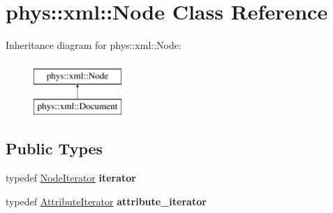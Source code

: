 \hypertarget{classphys_1_1xml_1_1Node}{
\section{phys::xml::Node Class Reference}
\label{d7/d0a/classphys_1_1xml_1_1Node}
}
Inheritance diagram for phys::xml::Node:\begin{figure}[H]
\begin{center}
\leavevmode
\includegraphics[height=2cm]{d7/d0a/classphys_1_1xml_1_1Node}
\end{center}
\end{figure}
\subsection*{Public Types}
\begin{DoxyCompactItemize}
\item 
\hypertarget{classphys_1_1xml_1_1Node_a0da067636c89829a111dd51037cea6b3}{
typedef \hyperlink{classphys_1_1xml_1_1NodeIterator}{NodeIterator} {\bfseries iterator}}
\label{d7/d0a/classphys_1_1xml_1_1Node_a0da067636c89829a111dd51037cea6b3}

\item 
\hypertarget{classphys_1_1xml_1_1Node_a3b37ee9a716fc3a6cd92733ccf28f26a}{
typedef \hyperlink{classphys_1_1xml_1_1AttributeIterator}{AttributeIterator} {\bfseries attribute\_\-iterator}}
\label{d7/d0a/classphys_1_1xml_1_1Node_a3b37ee9a716fc3a6cd92733ccf28f26a}

\end{DoxyCompactItemize}
